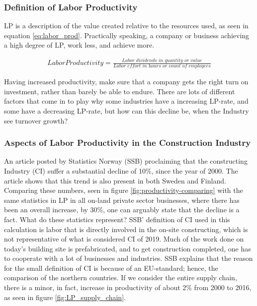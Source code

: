 \subsubsection{Definition of Labor Productivity}
LP is a description of the value created relative to the resources used, as seen in equation \ref{eq:labor_prod}. Practically speaking, a company or business achieving a high degree of LP, work less, and achieve more. 

\begin{eqnarray}\label{eq:labor_prod}
Labor Productivity = \frac{\textit{Labor dividends in quantity or value}}{\textit{Labor effort in hours or count of employees}} 
\end{eqnarray}

Having increased productivity, make sure that a company gets the right turn on investment, rather than barely be able to endure. There are lots of different factors that come in to play why some industries have a increasing LP-rate, and some have a decreasing LP-rate, but how can this decline be, when the Industry see turnover growth?

\subsubsection{Aspects of Labor Productivity in the Construction Industry}
An article \cite{ssb_productivity} posted by Statistics Norway (SSB) proclaiming that the constructing Industry (CI) suffer a substantial decline of 10\%, since the year of 2000. The article shows that this trend is also present in both Sweden and Finland. Comparing these numbers, seen in figure \ref{fig:productivity-comparing} with the same statistics in LP in all on-land private sector businesses, where there has been an overall increase, by 30\%, one can arguably state that the decline is a fact. What do these statistics represent? SSB' definition of CI used in this calculation is labor that is directly involved in the on-site constructing, which is not representative of what is considered CI of 2019. Much of the work done on today's building site is prefabricated, and to get construction completed, one has to cooperate with a lot of businesses and industries. SSB explains that the reason for the small definition of CI is because of an EU-standard; hence, the comparison of the northern countries. If we consider the entire supply chain, there is a minor, in fact, increase in productivity of about 2\% from 2000 to 2016, as seen in figure \ref{fig:LP_supply_chain}.

